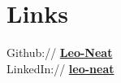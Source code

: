 \documentclass[letterpaper]{deedy-resume} %
\begin{document}
\begin{minipage}[t]{0.30\textwidth}

\section{Links} 

Github:// \href{https://github.com/Leo-Neat}{\bf Leo-Neat} \\
LinkedIn:// \href{https://www.linkedin.com/in/leo-neat-82b34b130/}{\bf leo-neat} \\

\sectionspace %

\end{minipage} %
\hfill
%
%
\end{document}
